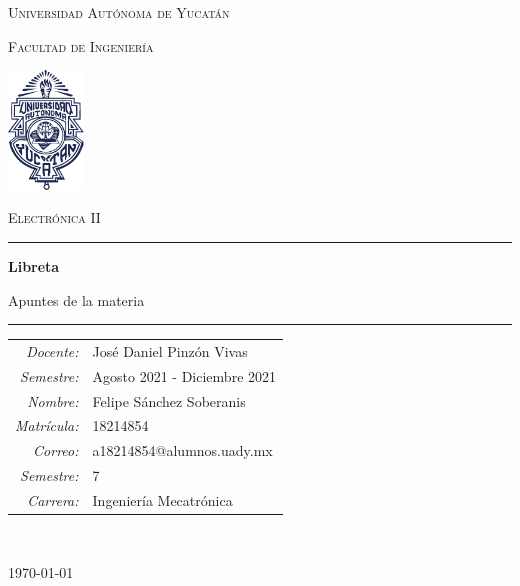 \documentclass[Libreta.tex]{subfiles}
\begin{document}
\thispagestyle{empty}
\setcounter{page}{0}

{
    \centering
    \setlength{\parindent}{0pt}

    {\LARGE\textsc{Universidad Autónoma de Yucatán}\\}

    {\large\textsc{Facultad de Ingeniería}\\}

    \vspace{2em}

    \includegraphics[width=0.15\textwidth]{Media/Logo UADY}

    \vspace{1em}

    {\Large\textsc{Electrónica II}\\}

    \vspace{1em}

    \rule{\textwidth}{1pt}

    {\LARGE\textbf{Libreta}\\}

    {\large Apuntes de la materia\\}

    \rule{\textwidth}{1pt}

    \vspace{3em}

    {
        \raggedright
        \begin{tabular}{r l}
            \textit{Docente:} & José Daniel Pinzón Vivas \\

            \textit{Semestre:} & Agosto 2021 - Diciembre 2021 \\

            \textit{Nombre:} & Felipe Sánchez Soberanis \\

            \textit{Matrícula:} & 18214854 \\

            \textit{Correo:} & a18214854@alumnos.uady.mx \\

            \textit{Semestre:} & 7 \\

            \textit{Carrera:} & Ingeniería Mecatrónica
        \end{tabular}
    \\}

    \vfill

    {
        \raggedleft
        \today
    \\}
}
\end{document}
